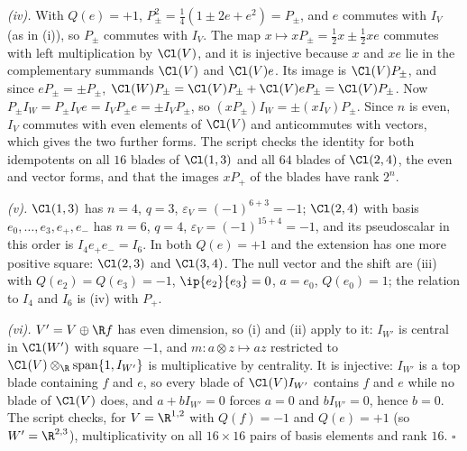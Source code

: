\emph{(iv).} With $Q(e) = +1$, $P_{\pm}^{2} = \tfrac14(1 \pm 2e + e^{2}) = P_{\pm}$, and $e$ commutes with $I_{V}$ (as in (i)), so $P_{\pm}$ commutes with $I_{V}$. The map $x \mapsto xP_{\pm} = \tfrac12 x \pm \tfrac12 xe$ commutes with left multiplication by $\Cl(V)$, and it is injective because $x$ and $xe$ lie in the complementary summands $\Cl(V)$ and $\Cl(V)e$. Its image is $\Cl(V)P_{\pm}$, and since $eP_{\pm} = \pm P_{\pm}$, $\Cl(W)P_{\pm} = \Cl(V)P_{\pm} + \Cl(V)eP_{\pm} = \Cl(V)P_{\pm}$. Now $P_{\pm}I_{W} = P_{\pm}I_{V}e = I_{V}P_{\pm}e = \pm I_{V}P_{\pm}$, so $(xP_{\pm})I_{W} = \pm(xI_{V})P_{\pm}$. Since $n$ is even, $I_{V}$ commutes with even elements of $\Cl(V)$ and anticommutes with vectors, which gives the two further forms. The script checks the identity for both idempotents on all $16$ blades of $\Cl(1,3)$ and all $64$ blades of $\Cl(2,4)$, the even and vector forms, and that the images $xP_{+}$ of the blades have rank $2^{n}$.

\emph{(v).} $\Cl(1,3)$ has $n = 4$, $q = 3$, $\varepsilon_{V} = (-1)^{6 + 3} = -1$; $\Cl(2,4)$ with basis $e_{0}, \dots, e_{3}, e_{+}, e_{-}$ has $n = 6$, $q = 4$, $\varepsilon_{V} = (-1)^{15 + 4} = -1$, and its pseudoscalar in this order is $I_{4}e_{+}e_{-} = I_{6}$. In both $Q(e) = +1$ and the extension has one more positive square: $\Cl(2,3)$ and $\Cl(3,4)$. The null vector and the shift are (iii) with $Q(e_{2}) = Q(e_{3}) = -1$, $\ip{e_{2}}{e_{3}} = 0$, $a = e_{0}$, $Q(e_{0}) = 1$; the relation to $I_{4}$ and $I_{6}$ is (iv) with $P_{+}$.

\emph{(vi).} $V' = V \oplus \R f$ has even dimension, so (i) and (ii) apply to it: $I_{W'}$ is central in $\Cl(W')$ with square $-1$, and $m: a \otimes z \mapsto az$ restricted to $\Cl(V) \otimes_{\R} \mathrm{span}\{1, I_{W'}\}$ is multiplicative by centrality. It is injective: $I_{W'}$ is a top blade containing $f$ and $e$, so every blade of $\Cl(V)I_{W'}$ contains $f$ and $e$ while no blade of $\Cl(V)$ does, and $a + bI_{W'} = 0$ forces $a = 0$ and $bI_{W'} = 0$, hence $b = 0$. The script checks, for $V = \R^{1,2}$ with $Q(f) = -1$ and $Q(e) = +1$ (so $W' = \R^{2,3}$), multiplicativity on all $16 \times 16$ pairs of basis elements and rank $16$. $\square$
